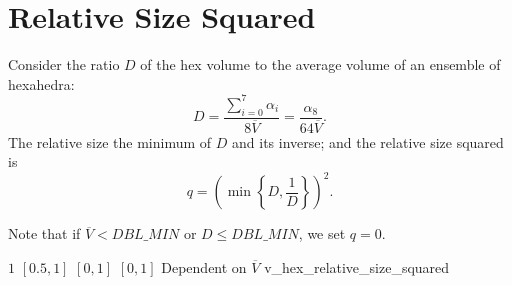 \section{Relative Size Squared\label{s:hex-relative-size-squared}}

Consider the ratio $D$ of the hex volume to the average volume of an ensemble of hexahedra:
\[
D = \frac{\sum_{i=0}^7 \alpha_i}{8\overline{V}} = \frac{\alpha_8}{64\overline{V}}.
\]
The relative size the minimum of $D$ and its inverse; and the relative size squared is
\[
  q = \left(\min\left\{ D, \frac {1}{D} \right\}\right)^2 .
\]

Note that if $\overline{V} < DBL\_MIN$ or $D \leq DBL\_MIN$, we set $q = 0$.

%
{$1$}%
{$[0.5,1]$}%
{$[0,1]$}%
{$[0,1]$}%
{Dependent on $\overline{V}$}%
{\cite{knu:03}}%
{v\_hex\_relative\_size\_squared}%
